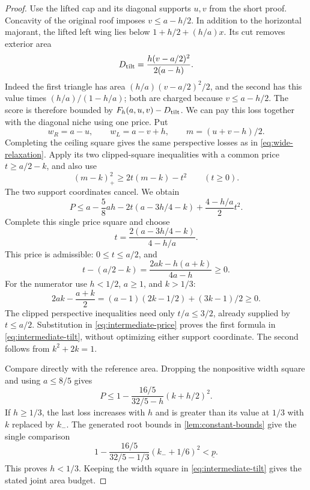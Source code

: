 \begin{proof}
Use the lifted cap and its diagonal supports $u,v$ from the short
proof. Concavity of the original roof imposes $v\le a-h/2$.
In addition to the horizontal majorant, the lifted left wing lies
below $1+h/2+(h/a)x$. Its cut removes exterior area
\[
 D_{\rm tilt}=\frac{h(v-a/2)^2}{2(a-h)}.
\]
Indeed the first triangle has area
$(h/a)(v-a/2)^2/2$, and the second has this value times
$(h/a)/(1-h/a)$; both are charged because $v\le a-h/2$.
The score is therefore bounded by $F_h(a,u,v)-D_{\rm tilt}$.
We can pay this loss together with the diagonal niche using one price.
Put
\[
 w_R=a-u,\qquad w_L=a-v+h,\qquad m=(u+v-h)/2.
\]
Completing the ceiling square gives the same perspective losses as in
\cref{eq:wide-relaxation}. Apply its two clipped-square inequalities
with a common price $t\ge a/2-k$, and also use
\[
 (m-k)_+^2\ge2t(m-k)-t^2\qquad(t\ge0).
\]
The two support coordinates cancel. We obtain
\begin{equation}\label{eq:intermediate-price}
 P\le a-\frac58ah-2t(a-3h/4-k)+\frac{4-h/a}{2}t^2.
\end{equation}
Complete this single price square and choose
\[
 t=\frac{2(a-3h/4-k)}{4-h/a}.
\]
This price is admissible: $0\le t\le a/2$, and
\[
 t-(a/2-k)=\frac{2ak-h(a+k)}{4a-h}\ge0.
\]
For the numerator use $h<1/2$, $a\ge1$, and $k>1/3$:
\[
 2ak-\frac{a+k}{2}
 =(a-1)(2k-1/2)+(3k-1)/2\ge0.
\]
The clipped perspective inequalities need only $t/a\le3/2$, already
supplied by $t\le a/2$. Substitution in \cref{eq:intermediate-price}
proves the first formula in \cref{eq:intermediate-tilt}, without
optimizing either support coordinate. The second follows from
$k^2+2k=1$.

Compare directly with the reference area. Dropping the nonpositive
width square and using $a\le8/5$ gives
\[
 P\le1-\frac{16/5}{32/5-h}(k+h/2)^2.
\]
If $h\ge1/3$, the last loss increases with $h$ and is greater than
its value at $1/3$ with $k$ replaced by $k_-$. The generated root
bounds in \cref{lem:constant-bounds} give the single comparison
\[
 1-\frac{16/5}{32/5-1/3}(k_-+1/6)^2<\underline p.
\]
This proves $h<1/3$. Keeping the width square in
\cref{eq:intermediate-tilt} gives the stated joint area budget.

\end{proof}


